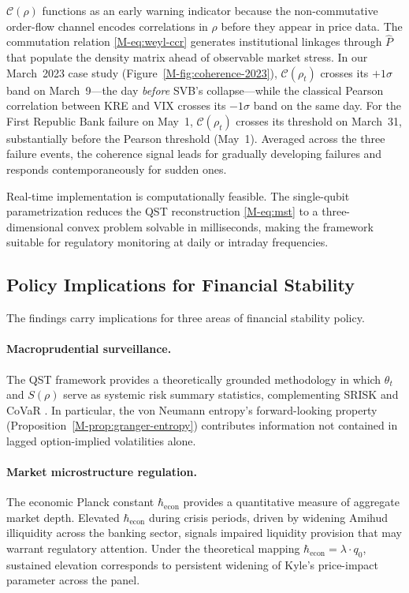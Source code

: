$\mathcal{C}(\rho)$ functions as an early warning indicator because the
non-commutative order-flow channel encodes correlations in $\rho$ before they
appear in price data. The commutation relation \eqref{M-eq:weyl-ccr} generates
institutional linkages through $\hat{P}$ that populate the density matrix ahead
of observable market stress. In our March~2023 case study
(Figure~\ref{M-fig:coherence-2023}), $\mathcal{C}(\rho_t)$ crosses its $+1\sigma$
band on March~9---the day \emph{before} SVB's collapse---while the classical
Pearson correlation between KRE and VIX crosses its $-1\sigma$ band on the same
day. For the First Republic Bank failure on May~1, $\mathcal{C}(\rho_t)$ crosses
its threshold on March~31, substantially before the Pearson threshold
(May~1). Averaged across the three
failure events, the coherence signal leads for gradually developing failures
and responds contemporaneously for sudden ones.

Real-time implementation is computationally feasible. The single-qubit
parametrization reduces the QST reconstruction \eqref{M-eq:mst} to a
three-dimensional convex problem solvable in milliseconds, making the framework
suitable for regulatory monitoring at daily or intraday frequencies.

\subsection{Policy Implications for Financial Stability}\label{sec:policy}

The findings carry implications for three areas of financial stability policy.

\paragraph{Macroprudential surveillance.}
The QST framework provides a theoretically grounded methodology in which
$\theta_t$ and $S(\rho)$ serve as systemic risk summary statistics, complementing
SRISK \citep{brownlees2016srisk} and CoVaR \citep{adrian2016covar}. In particular,
the von Neumann entropy's forward-looking property
(Proposition~\ref{M-prop:granger-entropy}) contributes information not contained in
lagged option-implied volatilities alone.

\paragraph{Market microstructure regulation.}
The economic Planck constant $\hbar_{\mathrm{econ}}$ provides a quantitative
measure of aggregate market depth. Elevated $\hbar_{\mathrm{econ}}$ during
crisis periods, driven by widening Amihud illiquidity across the banking sector,
signals impaired liquidity provision that may warrant regulatory attention.
Under the theoretical mapping $\hbar_{\mathrm{econ}} = \lambda \cdot q_0$,
sustained elevation corresponds to persistent widening of Kyle's price-impact
parameter across the panel.

